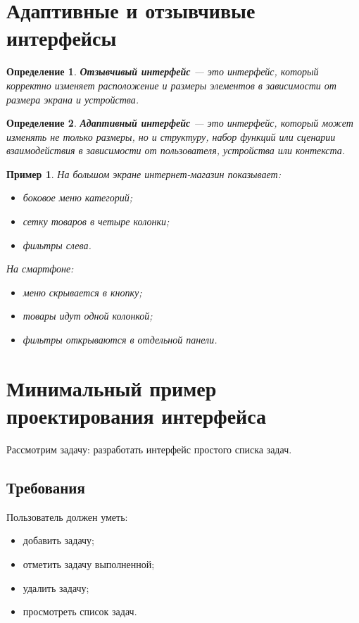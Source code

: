 \documentclass[12pt,a4paper]{article}
\newtheorem{definition}{Определение}
\newtheorem{example}{Пример}
\begin{document}
\section{Адаптивные и отзывчивые интерфейсы}

\begin{definition}
\textbf{Отзывчивый интерфейс} --- это интерфейс, который корректно изменяет расположение и размеры элементов в зависимости от размера экрана и устройства.
\end{definition}

\begin{definition}
\textbf{Адаптивный интерфейс} --- это интерфейс, который может изменять не только размеры, но и структуру, набор функций или сценарии взаимодействия в зависимости от пользователя, устройства или контекста.
\end{definition}

\begin{example}
На большом экране интернет-магазин показывает:
\begin{itemize}
    \item боковое меню категорий;
    \item сетку товаров в четыре колонки;
    \item фильтры слева.
\end{itemize}

На смартфоне:
\begin{itemize}
    \item меню скрывается в кнопку;
    \item товары идут одной колонкой;
    \item фильтры открываются в отдельной панели.
\end{itemize}
\end{example}

\section{Минимальный пример проектирования интерфейса}

Рассмотрим задачу: разработать интерфейс простого списка задач.

\subsection{Требования}

Пользователь должен уметь:
\begin{itemize}
    \item добавить задачу;
    \item отметить задачу выполненной;
    \item удалить задачу;
    \item просмотреть список задач.
\end{itemize}
\end{document}
